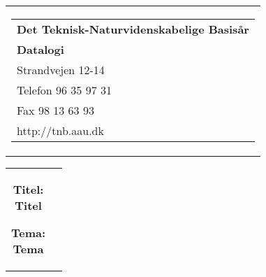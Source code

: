 \documentclass[12pt,hidelinks]{article}
\begin{document}
	\begin{titlepage}
	\begin{nopagebreak}
	{\small\samepage 
	\hfill\begin{tabular}{r}
	\parbox{6cm}{  
	\hfill \parbox{4.9cm}{\begin{tabular}{l}
	{\sf\small \textbf{Det Teknisk-Naturvidenskabelige Basis{\aa}r }}\\
	{\sf\small  \textbf{Datalogi}} \\
	{\sf\small Strandvejen 12-14} \\
	{\sf\small Telefon 96 35 97 31} \\
	{\sf\small Fax 98 13 63 93} \\
	{\sf\small http://tnb.aau.dk}
	\end{tabular}}}
	\\
	\end{tabular}

	\begin{tabular}{cc}
	\parbox{7cm}{
	\begin{description}

	\item {\bf Titel: \\Titel} 
	  
	\item {\bf Tema: \\Tema} 

	\end{description}

	\parbox{7cm}{

}}
\end{tabular}}
\end{nopagebreak}
\end{titlepage}
\end{document}
